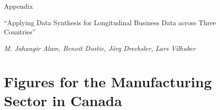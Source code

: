 
\newpage



\FloatBarrier

\appendix

\begin{center}
{\LARGE{Appendix}}

{``Applying Data Synthesis for Longitudinal Business Data across Three Countries''}

\textit{M. Jahangir Alam, Benoit Dostie, J\"org Drechsler, Lars Vilhuber}

\end{center}


\section{Figures for the Manufacturing Sector in Canada}
\label{sec:appendix_figures}

